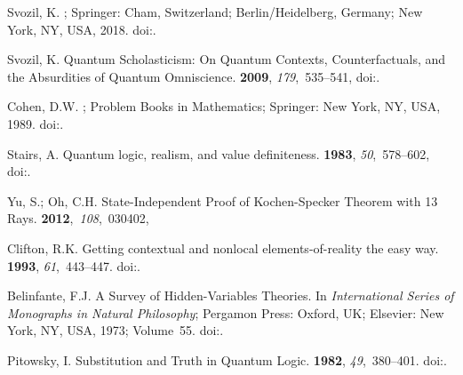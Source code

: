 \begin{thebibliography}{999}
Svozil, K.
; Springer: Cham, Switzerland; Berlin/Heidelberg, Germany; New York, NY, USA, 2018.
\newblock
 doi:{\href{https://doi.org/10.1007/978-3-319-70815-7}{}}.

Svozil, K.
\newblock Quantum Scholasticism: On Quantum Contexts, Counterfactuals, and the
 Absurdities of Quantum Omniscience.
 {\bf 2009}, {\em 179},~535--541,
\newblock
 doi:{\href{https://doi.org/10.1016/j.ins.2008.06.012}{}}.

Cohen, D.W.
; Problem
 Books in Mathematics; Springer: New York, NY, USA, 1989.
\newblock
 doi:{\href{https://doi.org/10.1007/978-1-4613-8841-8}{}}.

Stairs, A.
\newblock Quantum logic, realism, and value definiteness.
 {\bf 1983}, {\em 50},~578--602,
\newblock
 doi:{\href{https://doi.org/10.1086/289140}{}}.

Yu, S.; Oh, C.H.
\newblock State-Independent Proof of {K}ochen-{S}pecker Theorem with 13 Rays.
 {\bf 2012},~{\em 108},~030402,

Clifton, R.K.
\newblock Getting contextual and nonlocal elements-of-reality the easy way.
 {\bf 1993}, {\em 61},~443--447.
\newblock
 doi:{\href{https://doi.org/10.1119/1.17239}{}}.

Belinfante, F.J.
\newblock A Survey of Hidden-Variables Theories. In {\em
 International Series of Monographs in Natural Philosophy}; Pergamon Press: Oxford, UK; Elsevier: New York, NY, USA, 1973; Volume~55.
\newblock
 doi:{\href{https://doi.org/10.1016/B978-0-08-017032-9.50001-7}{}}.

Pitowsky, I.
\newblock Substitution and Truth in Quantum Logic.
 {\bf 1982}, {\em 49},~380--401.
\newblock
 doi:{\href{https://doi.org/10.2307/187281}{}}.


\end{thebibliography}
